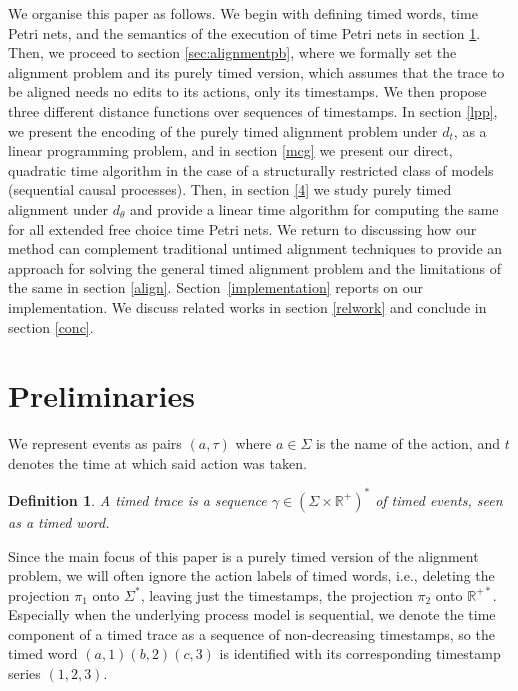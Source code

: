 \documentclass[conference]{IEEEtran}
\newtheorem{definition}{Definition}
\begin{document}
 We organise this paper as follows. We begin with defining timed words, time Petri nets, and the semantics of the execution of time Petri nets in section \ref{preliminaries}. Then, we proceed to section \ref{sec:alignmentpb}, where we formally set the alignment problem and its purely timed version, which assumes that the trace to be aligned needs no edits to its actions, only its timestamps. We then propose three different distance functions over sequences of timestamps. 
   In section \ref{lpp}, we present the encoding of the purely timed alignment problem under $d_t$, as a linear programming problem, and in section \ref{mcg} we present our direct, quadratic time algorithm in the case of a structurally restricted class of models (sequential causal processes).
    Then, in section \ref{4} we study purely timed alignment under $d_\theta$ and provide a linear time algorithm for computing the same for all extended free choice time Petri nets. We return to discussing how our method can complement traditional untimed alignment techniques to provide an approach for solving the general timed alignment problem and the limitations of the same in section \ref{align}. Section~\ref{implementation} reports on our implementation. We discuss related works in section \ref{relwork} and conclude in section \ref{conc}. 

	
	\section{Preliminaries}\label{preliminaries}
	We represent events as pairs $(a,\tau)$ where $a \in \Sigma$ is the name of the action, and $t$ denotes the time at which said action was taken.
    
    \begin{definition}
        A timed trace is a sequence $\gamma \in (\Sigma \times \mathbb{R}^+)^*$ of timed events, seen as a timed word. 
    \end{definition}
    
   Since the main focus of this paper is a purely timed version of the alignment problem, we will often ignore the action labels of timed words, i.e., deleting the projection $\pi_1$ onto $\Sigma^*$, leaving just the timestamps, the projection $\pi_2$ onto $\mathbb{R}^{+*}$. 
    Especially when the underlying process model is sequential, we denote the time component of a timed trace as a sequence of non-decreasing timestamps, so the timed word $(a,1)(b,2)(c,3)$ is identified with its corresponding timestamp series $(1,2,3)$. 
\end{document}
